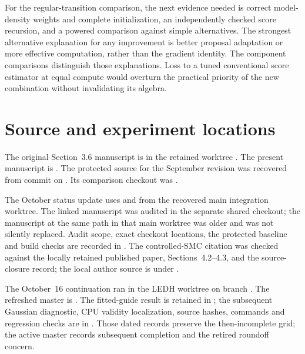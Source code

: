 \documentclass[11pt]{article}
\begin{document}
For the regular-transition comparison, the next evidence needed is correct
model-density weights and complete initialization, an independently checked
score recursion, and a powered comparison against simple alternatives. The
strongest alternative explanation for any improvement is better proposal
adaptation or more effective computation, rather than the gradient identity.
The component comparisons distinguish those explanations. Loss to a tuned
conventional score estimator at equal compute would overturn the practical
priority of the new combination without invalidating its algebra.


\appendix
\section{Source and experiment locations}

The original Section~3.6 manuscript is
in the retained worktree
.
The present manuscript is
.
The protected source for the September revision was recovered from commit
 on
. Its comparison checkout was
.

The October status update uses
and 
from the recovered main integration worktree. The linked manuscript was
audited in the separate shared  checkout; the manuscript
at the same path in that main worktree was older and was not silently
replaced. Audit scope, exact checkout locations, the protected baseline and
build checks are recorded in
.
The controlled-SMC citation was checked against the locally retained
published paper, Sections~4.2--4.3, and the source-closure record; the local
author source is under .

The October~16 continuation ran in the LEDH worktree on branch
. The refreshed master is
.
The fitted-guide result is retained in
; the subsequent
Gaussian diagnostic, CPU validity localization, source hashes, commands and
regression checks are in
.
Those dated records preserve the then-incomplete grid; the active master
records subsequent completion and the retired roundoff concern.
\end{document}
